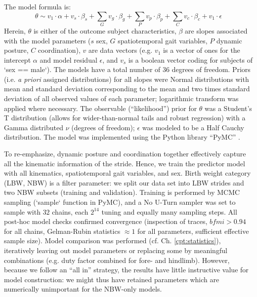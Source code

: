 The model formula is:
\begin{equation} \theta \sim v_{1}\cdot\alpha + v_{s}\cdot\beta_{s} + \sum\limits_{G} v_{g}\cdot\beta_{g} + \sum\limits_{P}  v_{p}\cdot\beta_{p} +  \sum\limits_{C} v_{c}\cdot\beta_{c} + v_{1}\cdot\epsilon \label{eq:model} \end{equation}
Herein, \(\theta\) is either of the outcome subject characteristics, \(\beta\) are slopes associated with the model parameters (\(s\) sex, \(G\) spatiotemporal gait variables, \(P\) dynamic posture, \(C\) coordination), \(v\) are data vectors (e.g. \(v_{1}\) is a vector of ones for the intercept \(\alpha\) and model residual \(\epsilon\), and \(v_{s}\) is a boolean vector coding for subjects of `sex == male`).
The models have a total number of 36 degrees of freedom.
Priors (i.e. \emph{a priori} assigned distributions) for all slopes were Normal distributions with mean and standard deviation corresponding to the mean and two times standard deviation of all observed values of each parameter; logarithmic transform was applied where necessary.
The observable (``likelihood'') prior for \(\theta\) was a Student's T distribution (allows for wider-than-normal tails and robust regression) with a Gamma distributed \(\nu\) (degrees of freedom); \(\epsilon\) was modeled to be a Half Cauchy distribution.
The model was implemented using the Python library ``PyMC'' \citep[different versions up to 5.10.2;][]{Salvatier2016}.


To re-emphasize, dynamic posture and coordination together effectively capture all the kinematic information of the stride.
Hence, we train the predictor model with all kinematics, spatiotemporal gait variables, and sex.
Birth weight category (LBW, NBW) is a filter parameter: we split our data set into LBW strides and two NBW subsets (training and validation).
Training is performed by MCMC sampling (`sample` function in PyMC), and a No U-Turn sampler was set to sample with \(32\) chains, each \(2^{14}\) tuning and equally many sampling steps.
All post-hoc model checks confirmed convergence (inspection of traces, \(bfmi>0.94\) for all chains, Gelman-Rubin statistics \(\approx 1\) for all parameters, sufficient effective sample size).
Model comparison was performed (cf. Ch. \ref{cpt:statistics}), iteratively leaving out model parameters or replacing some by meaningful combinations (e.g. duty factor combined for fore- and hindlimb).
However, because we follow an ``all in'' strategy, the results have little instructive value for model construction: we might thus have retained parameters which are numerically unimportant for the NBW-only models.




